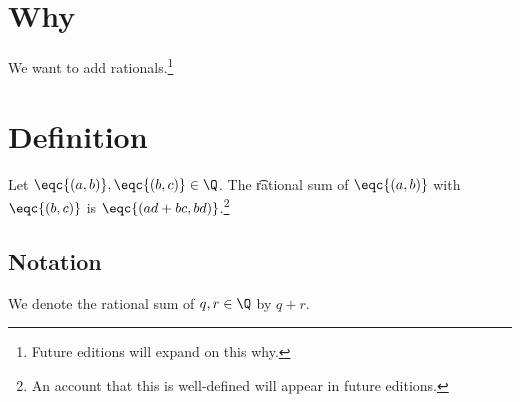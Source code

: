 
\section*{Why}

We want to add rationals.\footnote{Future editions will expand on this why.}

\section*{Definition}

Let $\eqc{(a, b)}, \eqc{(b, c)} \in \Q $.
The \t{rational sum} of $\eqc{(a, b)}$ with $\eqc{(b, c)}$ is $\eqc{(ad + bc, bd)}$.\footnote{An account that this is well-defined will appear in future editions.}

\subsection*{Notation}

We denote the rational sum of $q, r \in \Q $ by $q + r$.

\blankpage
